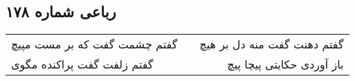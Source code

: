 \begin{center}
\section*{رباعی شماره ۱۷۸}
\label{sec:sh178}
\begin{longtable}{l p{0.5cm} r}
گفتم چشمت گفت که بر مست مپیچ
&&
گفتم دهنت گفت منه دل بر هیچ
\\
گفتم زلفت گفت پراکنده مگوی
&&
باز آوردی حکایتی پیچا پیچ
\\
\end{longtable}
\end{center}
